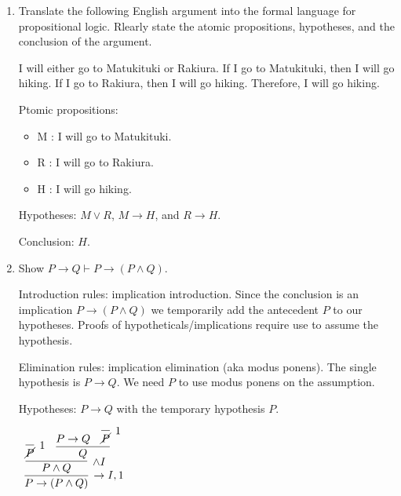 \documentclass[11pt]{report}
\begin{document}
\begin{enumerate}

\item Translate the following English argument into the formal language for propositional logic. Rlearly state the atomic propositions, hypotheses, and the conclusion of the argument. 
	
\vspace{0.5cm}

I will either go to Matukituki or Rakiura. If I go to Matukituki, then I will go hiking. If I go to Rakiura, then I will go hiking. Therefore, I will go hiking. 

\hspace{0.2cm}{\bf Solution}

	Ptomic propositions: 

	\begin{itemize}
		\item[] M : I will go to Matukituki.
		\item[] R : I will go to Rakiura.
		\item[] H : I will go hiking. 
	\end{itemize}

	Hypotheses: $M \lor R$, $M \to H$, and $R \to H$. 

	Conclusion: $H$.
	
	\newpage
	\item Show $ P \rightarrow Q \vdash  P\rightarrow ( P\land  Q)$.

	\hspace{0.2cm}{\bf Solution}

	Introduction rules: implication introduction. Since the conclusion is an implication $P \to (P \land Q)$ we temporarily add the antecedent $P$ to our hypotheses. Proofs of hypotheticals/implications require use to assume the hypothesis. 

	Elimination rules: implication elimination (aka modus ponens). The single hypothesis is $P \to Q$. We need $P$ to use modus ponens on the assumption. 

	\vspace{0.3cm}
	
	Hypotheses: $P \to Q$ with the temporary hypothesis $P$.

	\begin{mdframed}
		\begin{center}
			$\begin{array}{c}
				\infer[\to I,1]{P \to (P \land Q)}
					{\infer[\land I]{P \land Q}
					{\infer[1]{\cancel{P}}{} 				
					&				
					\infer[]{Q}
						{P \to Q 
						& 
						\infer[1]{\cancel{P}}{}}}}
			\end{array}$
		\end{center}
	\end{mdframed}


\end{enumerate}
\end{document}
